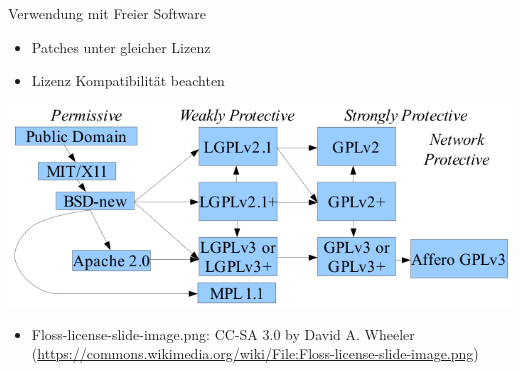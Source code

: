 \begin{frame}{Verwendung mit Freier Software}
	\pause
	\begin{itemize}
		\item Patches unter gleicher Lizenz
		\pause
		\item Lizenz Kompatibilität beachten
	\end{itemize}
	\pause
	\begin{center}
		\includegraphics[width=\textwidth]{res/floss-license-compability.png}
	\end{center}
\end{frame}
\note
{
	\begin{itemize}
		\item Floss-license-slide-image.png: CC-SA 3.0 by David A. Wheeler (\url{https://commons.wikimedia.org/wiki/File:Floss-license-slide-image.png})
	\end{itemize}
}


